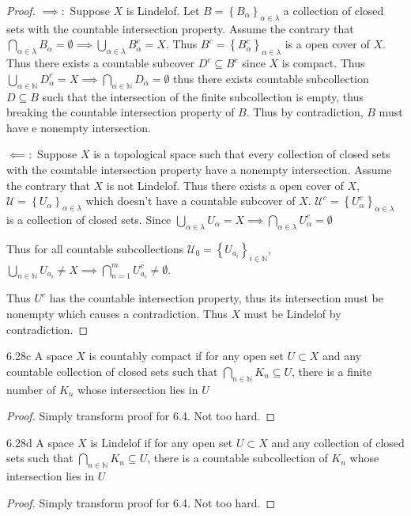 \documentclass{article}
\newcommand*{\subeq}{\subseteq}
\newcommand{\N}{\mathbb{N}}
\begin{document}
\begin{proof}
    $\implies:$ Suppose $X$ is Lindelof. Let $B = \left\{ B_\alpha \right\}_{\alpha \in \lambda}$ a collection of closed sets with the countable intersection property.  Assume the contrary that $\bigcap_{\alpha \in \lambda} B_\alpha = \emptyset \implies \bigcup_{\alpha \in \lambda} B_{\alpha}^c = X$. Thus $B^c = \left\{ B_{\alpha}^c \right\}_{\alpha \in \lambda}$ is a open cover of $X$. Thus there exists a countable subcover $D^c \subseteq B^c$ since $X$ is compact. Thus $\bigcup_{\alpha \in \N} D^c_\alpha = X \implies \bigcap_{\alpha \in \N}D_\alpha = \emptyset$ thus there exists countable subcollection $D \subseteq B$ such that the intersection of the finite subcollection is empty, thus breaking the countable intersection property of $B$. Thus by contradiction, $B$ must have e nonempty intersection.
    
    $\impliedby:$ Suppose $X$ is a topological space such that every collection of closed sets with the countable intersection property have a nonempty intersection. Assume the contrary that $X$ is not Lindelof. Thus there exists a open cover of $X$, $\mathcal{U} = \left\{ U_\alpha \right\}_{\alpha \in \lambda}$ which doesn't have a countable subcover of $X$. $\mathcal{U}^c = \left\{ U_\alpha^c \right\}_{\alpha \in \lambda}$ is a collection of closed sets. Since $\bigcup_{\alpha \in \lambda} U_\alpha = X \implies \bigcap_{\alpha \in \lambda} U_\alpha^c = \emptyset$ 
    
    Thus for all countable subcollections $\mathcal{U}_0 = \left\{ U_{a_{i}} \right\}_{i \in \N}$, $\bigcup_{n \in \N} U_{a_i} \neq X \implies \bigcap_{n = 1}^{m}U_{a_i}^c \neq \emptyset$. 
    
    Thus $U^c$ has the countable intersection property, thus its intersection must be nonempty which causes a contradiction. Thus $X$ must be Lindelof by contradiction.  
\end{proof}
\begin{claim}{6.28c}\label{Claim 6.28c.}
    A space $X$ is countably compact if for any open set $U \subset X$ and any countable collection of closed sets such that $\bigcap_{n \in \N} K_{n} \subeq U$, there is a finite number of $K_n$ whose intersection lies in $U$      
\end{claim}
\begin{proof}
    Simply transform proof for 6.4. Not too hard. 
\end{proof}
\begin{claim}{6.28d}\label{Claim 6.28d.}
    A space $X$ is Lindelof if for any open set $U \subset X$ and any collection of closed sets such that $\bigcap_{n \in \N} K_{n} \subeq U$, there is a countable subcollection of $K_n$ whose intersection lies in $U$      
\end{claim}
\begin{proof}
    Simply transform proof for 6.4. Not too hard. 
\end{proof}
\end{document}
